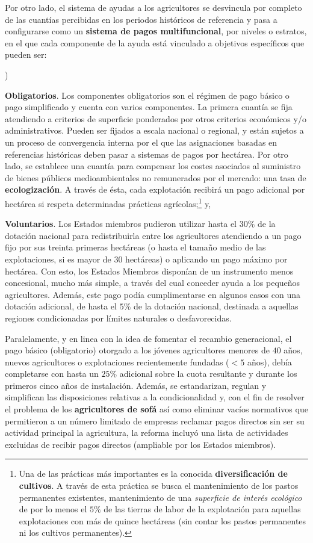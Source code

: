 \documentclass[10pt,a4paper]{article}
\newcounter{alphaitem}
\newenvironment{la}
      {\begin{list}{\alph{alphaitem})}{%
          \usecounter{alphaitem}%
          \setlength{\leftmargin}{1cm}%
          \setlength{\parskip}{3pt}%
          \setlength{\itemsep}{0pt}%
          \setlength{\parsep}{0pt}%
      }}
      {\end{list}}
\begin{document}
Por otro lado, el sistema de ayudas a los agricultores se desvincula por completo de las cuantías percibidas en los periodos históricos de referencia y pasa a configurarse como un \textbf{sistema de pagos multifuncional}, por niveles o estratos, en el que cada componente de la ayuda está vinculado a objetivos específicos que pueden ser: 
\begin{la}
  \item \textbf{Obligatorios}. Los componentes obligatorios son el régimen de pago básico o pago simplificado y cuenta con varios componentes. La primera cuantía se fija atendiendo a criterios de superficie ponderados por otros criterios económicos y/o administrativos. Pueden ser fijados a escala nacional o regional, y están sujetos a un proceso de convergencia interna por el que las asignaciones basadas en referencias históricas deben pasar a sistemas de pagos por hectárea. Por otro lado, se establece una cuantía para compensar los costes asociados al suministro de bienes públicos medioambientales no remunerados por el mercado: una tasa de \textbf{ecologización}. A través de ésta, cada explotación recibirá un pago adicional por hectárea si respeta determinadas prácticas agrícolas;\footnote{%
      Una de las prácticas más importantes es la conocida \textbf{diversificación de cultivos}. A través de esta práctica se busca el mantenimiento de los pastos permanentes existentes, mantenimiento de una \textit{superficie de interés ecológico} de por lo menos el $5\%$ de las tierras de labor de la explotación para aquellas explotaciones con más de quince hectáreas (sin contar los pastos permanentes ni los cultivos permanentes).
  } y,
  \item \textbf{Voluntarios}. Los Estados miembros pudieron utilizar hasta el $30\%$ de la dotación nacional para redistribuirla entre los agricultores atendiendo a un pago fijo por sus treinta primeras hectáreas (o hasta el tamaño medio de las explotaciones, si es mayor de 30 hectáreas) o aplicando un pago máximo por hectárea. Con esto, los Estados Miembros disponían de un instrumento menos concesional, mucho más simple, a través del cual conceder ayuda a los pequeños agricultores. Además, este pago podía cumplimentarse en algunos casos con una dotación adicional, de hasta el $5\%$ de la  dotación nacional, destinada a aquellas regiones condicionadas por límites naturales o desfavorecidas.
\end{la}

Paralelamente, y en linea con la idea de fomentar el recambio generacional, el pago básico (obligatorio) otorgado a los jóvenes agricultores menores de $40$ años, nuevos agricultores o explotaciones recientemente fundadas ($<5$ años), debía completarse con hasta un $25\%$ adicional sobre la cuota resultante y durante los primeros cinco años de instalación. Además, se estandarizan, regulan y simplifican las disposiciones relativas a la condicionalidad y, con el fin de resolver el problema de los \textbf{agricultores de sofá} así como eliminar vacíos normativos que permitieron a un número limitado de empresas reclamar pagos directos sin ser su actividad principal la agricultura, la reforma incluyó una lista de actividades excluidas de recibir pagos directos (ampliable por los Estados miembros).
\end{document}
